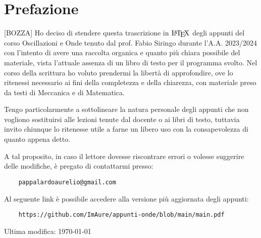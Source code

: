 \chapter*{Prefazione}\label{s:preface}
[BOZZA] Ho deciso di stendere questa trascrizione in $\text{\LaTeX}$ degli appunti del corso Oscillazioni e Onde tenuto dal prof. Fabio Siringo durante l'A.A. 2023/2024 con l'intento di avere una raccolta organica e quanto pi\`u chiara possibile del materiale, vista l'attuale assenza di un libro di testo per il programma svolto. Nel corso della scrittura ho voluto prendermi la libert\`a di approfondire, ove lo ritenessi necessario ai fini della completezza e della chiarezza, con materiale preso da testi di Meccanica e di Matematica. \par Tengo particolarmente a sottolineare la natura personale degli appunti che non vogliono sostituirsi alle lezioni tenute dal docente o ai libri di testo, tuttavia invito chiunque lo ritenesse utile a farne un libero uso con la consapevolezza di quanto appena detto. \par A tal proposito, in caso il lettore dovesse riscontrare errori o volesse suggerire delle modifiche, \`e pregato di contattarmi presso:
\begin{verbatim}
    pappalardoaurelio@gmail.com
\end{verbatim}\par
Al seguente link \`e possibile accedere alla versione pi\`u aggiornata degli appunti:
\begin{verbatim}
    https://github.com/ImAure/appunti-onde/blob/main/main.pdf
\end{verbatim}
\begin{center}
    Ultima modifica: \today
\end{center}
